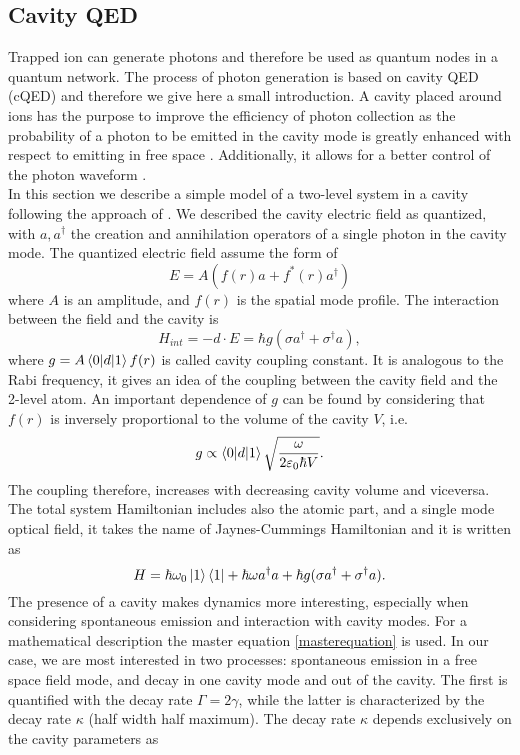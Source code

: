 \subsection{Cavity QED}
\label{sec:cavityqed}
Trapped ion can generate photons and therefore be used as quantum nodes in a quantum network. The process of photon generation is based on cavity QED (cQED) and therefore we give here a small introduction. A cavity placed around ions has the purpose to improve the efficiency of photon collection as the probability of a photon to be emitted in the cavity mode is greatly enhanced with respect to emitting in free space \cite{Kimble_1998}. Additionally, it allows for a better control of the photon waveform \cite{Keller2004}.\\
In this section we describe a simple model of a two-level system in a cavity following the approach of \cite{steck}. We described the cavity electric field as quantized, with $a,a^\dagger$ the creation and annihilation operators of a single photon in the cavity mode.
The quantized electric field assume the form of
\begin{equation}
E = A(f(r)a + f^*(r)a^\dagger)
\end{equation}
where $A$ is an amplitude, and $f(r)$ is the spatial mode profile. The interaction between the field and the cavity is
\begin{equation}
H_{int}  = -d\cdot E = \hbar g (\sigma a^\dagger + \sigma^\dagger a),
\end{equation}
where $g = A \braket{0|d|1} f(r)$ is called cavity coupling constant. It is analogous to the Rabi frequency, it gives an idea of the coupling between the cavity field and the 2-level atom. An important dependence of $g$ can be found by considering that $f(r)$ is inversely proportional to the volume of the cavity $V$, i.e.
\begin{equation}
g \propto \braket{0|d|1} \sqrt{\frac{\omega}{2\varepsilon_0 \hbar V}}.
\end{equation}
The coupling therefore, increases with decreasing cavity volume and viceversa.\\
The total system Hamiltonian includes also the atomic part, and a single mode optical field, it takes the name of Jaynes-Cummings Hamiltonian and it is written as \cite{qedreview}
\begin{equation}
H = \hbar \omega_0 \ket{1}\bra{1} + \hbar \omega a^\dagger a + \hbar g (\sigma a^\dagger + \sigma^\dagger a).
\end{equation}
The presence of a cavity makes dynamics more interesting, especially when considering spontaneous emission and interaction with cavity modes. For a mathematical description the master equation \eqref{masterequation} is used. In our case, we are most interested in two processes: spontaneous emission in a free space field mode, and decay in one cavity mode and out of the cavity. The first is quantified with the decay rate $\Gamma = 2\gamma$, while the latter is characterized by the decay rate $\kappa$ (half width half maximum). The decay rate $\kappa$ depends exclusively on the cavity parameters as \cite{helene}

